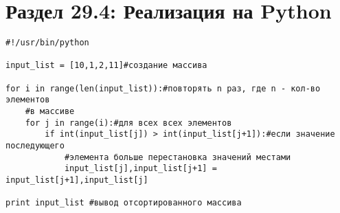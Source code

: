 \section*{Раздел 29.4: Реализация на Python}

\begin{tcolorbox} 
\begin{verbatim}
#!/usr/bin/python

input_list = [10,1,2,11]#создание массива

for i in range(len(input_list)):#повторять n раз, где n - кол-во элементов 
	#в массиве
	for j in range(i):#для всех всех элементов
		if int(input_list[j]) > int(input_list[j+1]):#если значение последующего 
			#элемента больше перестановка значений местами
			input_list[j],input_list[j+1] = input_list[j+1],input_list[j]

print input_list #вывод отсортированного массива
\end{verbatim}
\end{tcolorbox}


